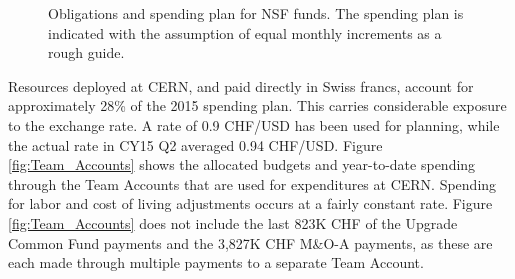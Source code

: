 \begin{figure}[hbtp]
  \begin{center}
    \caption{Obligations and spending plan for NSF funds.  The spending plan
is indicated with the assumption of equal monthly increments as a rough guide.}
    \label{fig:NSF_obligations}
  \end{center}
\end{figure}

Resources deployed at CERN, and paid directly in Swiss francs, account for approximately
28\% of the 2015 spending plan.  This carries considerable exposure to the exchange rate.
A rate of 0.9 CHF/USD has been used for planning, while the actual rate in
CY15 Q2 averaged 0.94 CHF/USD.  Figure \ref{fig:Team_Accounts} shows the
allocated budgets and year-to-date spending through the Team Accounts that are
used for expenditures at CERN.  Spending for labor and cost of living adjustments
occurs at a fairly constant rate.  Figure \ref{fig:Team_Accounts} does not include
the last 823K CHF of the Upgrade Common Fund payments and the 3,827K CHF M\&O-A payments,
as these are each made through multiple payments to a separate Team Account.

